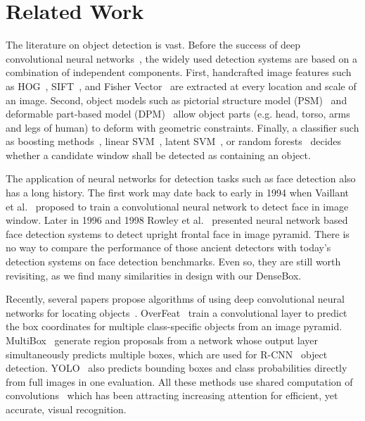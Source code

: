 \section{Related Work}

The literature on object detection is vast. Before the success of deep convolutional neural networks~\cite{krizhevsky2012imagenet}, the widely used detection systems are based on a combination of independent components. First, handcrafted image features such as HOG~\cite{dalal2005histograms,zhang2011boosted,yu2010object}, SIFT~\cite{lowe2004distinctive}, and Fisher Vector~\cite{cinbis2013segmentation} are extracted at every location and scale of an image. Second, object models such as pictorial structure model (PSM)~\cite{felzenszwalb2005pictorial} and deformable part-based model (DPM)~\cite{felzenszwalb2010object, zhu2012face, yang2013articulated} allow object parts (e.g. head, torso, arms and legs of human) to deform with geometric constraints. Finally, a classifier such as boosting methods~\cite{viola2004robust}, linear SVM~\cite{dalal2005histograms}, latent SVM~\cite{felzenszwalb2010object}, or random forests~\cite{dollar2012crosstalk} decides whether a candidate window shall be detected as containing an object.  

The application of neural networks for detection tasks such as face detection also has a long history. The first work may date back to early in 1994 when Vaillant et al.~\cite{vaillant1994original} proposed to train a convolutional neural network to detect face in image window. Later in 1996 and 1998 Rowley et al.~\cite{rowley1998neural,rowley1998rotation} presented neural network based face detection systems to detect upright frontal face in image pyramid. There is no way to compare the performance of those ancient detectors with today’s detection systems on face detection benchmarks. Even so, they are still worth revisiting, as we find many similarities in design with our DenseBox. 

Recently, several papers propose algorithms of using deep convolutional neural networks for locating objects~\cite{sermanet2013overfeat, erhan2014scalable, YOLO}. OverFeat~\cite{sermanet2013overfeat} train a convolutional layer to predict the box coordinates for multiple class-specific objects from an image pyramid. MultiBox~\cite{erhan2014scalable} generate region proposals from a network whose output layer simultaneously predicts multiple boxes, which are used for R-CNN~\cite{girshick2014rich} object detection. YOLO~\cite{YOLO} also predicts bounding boxes and class probabilities directly from full images in one evaluation. All these methods use shared computation of convolutions~\cite{sermanet2013overfeat, he2014spatial, ren2015faster, long2015fully} which has been attracting increasing attention for efficient, yet accurate, visual recognition. 

